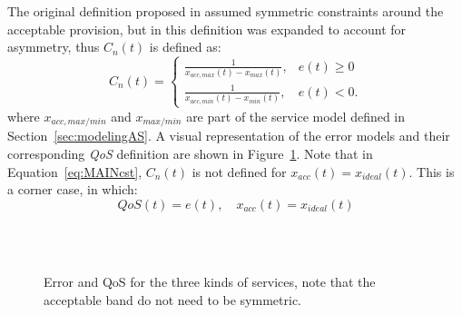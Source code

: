 The original definition proposed in \cite{bondy2014performance} assumed symmetric constraints around the acceptable provision, but in \cite{bondy2016method} this definition was expanded to account for asymmetry, thus $C_n(t)$ is defined as:
\begin{equation}
C_{n}(t) = 
\begin{cases}
\frac{1}{x_{acc,max}(t) - x_{max}(t)}, & e(t) \geq 0 \\
\frac{1}{x_{acc,min}(t) - x_{min}(t)}, & e(t) < 0.
\end{cases}\label{eq:MAINcst}
\end{equation}
where $x_{acc,max/min}$ and $x_{max/min}$ are part of the service model defined in Section~\ref{sec:modelingAS}. A visual representation of the error models and their corresponding \emph{QoS} definition are shown in Figure~\ref{fig:MAINerrorQoS}. Note that in Equation~\eqref{eq:MAINcst}, $C_{n}(t)$ is not defined for $x_{acc}(t) = x_{ideal}(t)$. This is a corner case, in which:
\begin{equation}
QoS(t) = e(t), \quad x_{acc}(t) = x_{ideal}(t)
\end{equation}

\begin{figure}[htpb!]
\centering
{} \\
\\
\caption{Error and QoS for the three kinds of services, note that the acceptable band do not need to be symmetric.}
\label{fig:MAINerrorQoS}
\end{figure}

